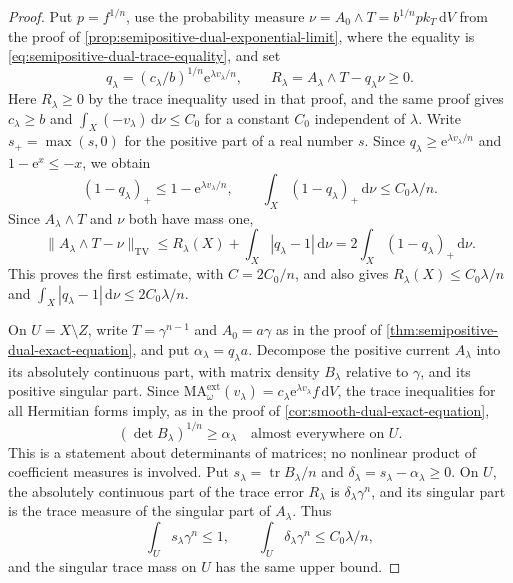 \begin{proof}
Put $p=f^{1/n}$, use the probability measure $\nu=A_0\wedge T=b^{1/n}p k_T\,\mathrm{d}V$ from the proof of \cref{prop:semipositive-dual-exponential-limit}, where the equality is \eqref{eq:semipositive-dual-trace-equality}, and set
\[
 q_\lambda=(c_\lambda/b)^{1/n}\mathrm{e}^{\lambda v_\lambda/n},
 \qquad R_\lambda=A_\lambda\wedge T-q_\lambda\nu\geq0.
\]
Here $R_\lambda\geq0$ by the trace inequality used in that proof, and the same proof gives $c_\lambda\geq b$ and $\int_X(-v_\lambda)\,\mathrm{d}\nu\leq C_0$ for a constant $C_0$ independent of $\lambda$. Write $s_+=\max(s,0)$ for the positive part of a real number $s$. Since $q_\lambda\geq\mathrm{e}^{\lambda v_\lambda/n}$ and $1-\mathrm{e}^{x}\leq-x$, we obtain
\[
 (1-q_\lambda)_+\leq1-\mathrm{e}^{\lambda v_\lambda/n},
 \qquad
 \int_X(1-q_\lambda)_+\,\mathrm{d}\nu\leq C_0\lambda/n.
\]
Since $A_\lambda\wedge T$ and $\nu$ both have mass one,
\[
 \|A_\lambda\wedge T-\nu\|_{\mathrm{TV}}
 \leq R_\lambda(X)+\int_X|q_\lambda-1|\,\mathrm{d}\nu
 =2\int_X(1-q_\lambda)_+\,\mathrm{d}\nu.
\]
This proves the first estimate, with $C=2C_0/n$, and also gives
$R_\lambda(X)\leq C_0\lambda/n$ and
$\int_X|q_\lambda-1|\,\mathrm{d}\nu\leq2C_0\lambda/n$.

On $U=X\setminus Z$, write $T=\gamma^{n-1}$ and $A_0=a\gamma$ as in the proof of \cref{thm:semipositive-dual-exact-equation}, and put $\alpha_\lambda=q_\lambda a$. Decompose the positive current $A_\lambda$ into its absolutely continuous part, with matrix density $B_\lambda$ relative to $\gamma$, and its positive singular part. Since $\mathrm{MA}^{\mathrm{ext}}_\omega(v_\lambda)=c_\lambda\mathrm{e}^{\lambda v_\lambda}f\,\mathrm{d}V$, the trace inequalities for all Hermitian forms imply, as in the proof of \cref{cor:smooth-dual-exact-equation},
\[
 (\det B_\lambda)^{1/n}\geq\alpha_\lambda
 \quad\text{almost everywhere on }U.
\]
This is a statement about determinants of matrices; no nonlinear product of coefficient measures is involved. Put $s_\lambda=\operatorname{tr}B_\lambda/n$ and $\delta_\lambda=s_\lambda-\alpha_\lambda\geq0$. On $U$, the absolutely continuous part of the trace error $R_\lambda$ is $\delta_\lambda\gamma^n$, and its singular part is the trace measure of the singular part of $A_\lambda$. Thus
\[
 \int_U s_\lambda\gamma^n\leq1,\qquad
 \int_U\delta_\lambda\gamma^n\leq C_0\lambda/n,
\]
and the singular trace mass on $U$ has the same upper bound.


\end{proof}
